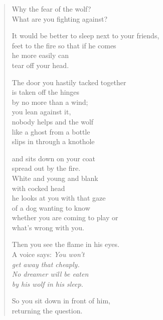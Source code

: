 \begin{verse}

Why the fear of the wolf?\\
What are you fighting against?

It would be better to sleep next to your friends,\\
feet to the fire so that if he comes\\
he more easily can\\
tear off your head.

The door you hastily tacked together\\
is taken off the hinges\\
by no more than a wind;\\
you lean against it,\\
nobody helps and the wolf\\
like a ghost from a bottle\\
slips in through a knothole

and sits down on your coat\\
spread out by the fire.\\
White and young and blank\\
with cocked head\\
he looks at you with that gaze\\
of a dog wanting to know\\
whether you are coming to play or\\
what's wrong with you.

Then you see the flame in his eyes.\\
A voice says: {\itshape You won't\\
get away that cheaply.\\
No dreamer will be eaten\\
by his wolf in his sleep.}

So you sit down in front of him,\\
returning the question.

\end{verse}
